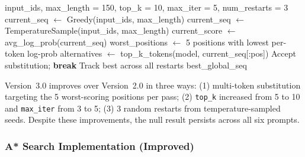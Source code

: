 \documentclass[12pt]{article}
\begin{document}
	\begin{algorithm}[H]
		\caption{Hill Climbing Search (Version 3.0)}
		\label{alg:hillclimb}
		\begin{algorithmic}[1]
			\Require input\_ids, max\_length = 150, top\_k = 10, max\_iter = 5, num\_restarts = 3
			\State current\_seq $\leftarrow$ Greedy(input\_ids, max\_length) 
			\Else
			\State current\_seq $\leftarrow$ TemperatureSample(input\_ids, max\_length) 
			\EndIf
			\State current\_score $\leftarrow$ avg\_log\_prob(current\_seq)
			\State worst\_positions $\leftarrow$ 5 positions with lowest per-token log-prob
			\State alternatives $\leftarrow$ top\_k\_tokens(model, current\_seq[:pos])
			\State Accept substitution; \textbf{break}
			\EndIf
			\EndFor
			\EndFor
			\EndFor
			\State Track best across all restarts
			\EndFor
			\Return best\_global\_seq
		\end{algorithmic}
	\end{algorithm}
	
	Version~3.0 improves over Version~2.0 in three ways: (1) multi-token substitution targeting the 5 worst-scoring positions per pass; (2) \texttt{top\_k} increased from 5 to 10 and \texttt{max\_iter} from 3 to 5; (3) 3 random restarts from temperature-sampled seeds. Despite these improvements, the null result persists across all six prompts.
	
	\subsubsection{A* Search Implementation (Improved)}
	
\end{document}
